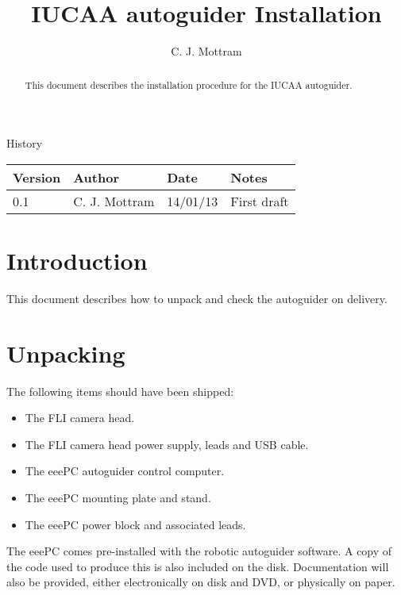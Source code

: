 \documentclass[10pt,a4paper]{article}
\title{IUCAA autoguider Installation}
\author{C. J. Mottram}
\date{}
\begin{document}
\thispagestyle{empty}
\maketitle
\begin{abstract}
This document describes the installation procedure for the IUCAA autoguider.
\end{abstract}
\centerline{\Large History}
\begin{center}
\begin{tabular}{|l|l|l|p{15em}|}
\hline
{\bf Version} & {\bf Author} & {\bf Date} & {\bf Notes} \\
\hline
0.1 & C. J. Mottram & 14/01/13 & First draft \\
\hline
\end{tabular}
\end{center}

\newpage
\tableofcontents
\listoffigures
\listoftables
\newpage

\newcommand{\mytilde}{\raise.17ex\hbox{$\scriptstyle\mathtt{\sim}$}}

\section{Introduction}

This document describes how to unpack and check the autoguider on delivery.

\section{Unpacking}

The following items should have been shipped:

\begin{itemize}
\item The FLI camera head.
\item The FLI camera head power supply, leads and USB cable.
\item The eeePC autoguider control computer.
\item The eeePC mounting plate and stand.
\item The eeePC power block and associated leads.
\end{itemize}

The eeePC comes pre-installed with the robotic autoguider software. A copy of the
code used to produce this is also included on the disk. Documentation will also be provided, either
electronically on disk and DVD, or physically on paper.
\end{document}
